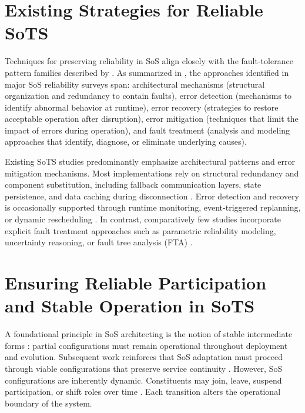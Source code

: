 
\section{Existing Strategies for Reliable SoTS} \label{approach:reliability-strategies}
Techniques for preserving reliability in SoS align closely with the fault-tolerance pattern families described by \citet{hanmer2013patterns}. As summarized in , the approaches identified in major SoS reliability surveys \cite{ferreira2021reliability, uday2015designing, abdelmoumen2026comprehensive} span: architectural mechanisms (structural organization and redundancy to contain faults), error detection (mechanisms to identify abnormal behavior at runtime), error recovery (strategies to restore acceptable operation after disruption), error mitigation (techniques that limit the impact of errors during operation), and fault treatment (analysis and modeling approaches that identify, diagnose, or eliminate underlying causes).

Existing SoTS studies predominantly emphasize architectural patterns and error mitigation mechanisms. Most implementations rely on structural redundancy and component substitution, including fallback communication layers, state persistence, and data caching during disconnection \cite{acharya2023twins, aziz2022empowering, larsen2024towards, lopez2023modeling}. Error detection and recovery is occasionally supported through runtime monitoring, event-triggered replanning, or dynamic rescheduling \cite{park2020digital, villalonga2021decision-making}. In contrast, comparatively few studies incorporate explicit fault treatment approaches such as parametric reliability modeling, uncertainty reasoning, or fault tree analysis (FTA) \cite{kutzke2021subsystem, oquendo2019dealing, saraeian2022digital}. 


\section{Ensuring Reliable Participation and Stable Operation in SoTS}

A foundational principle in SoS architecting is the notion of stable intermediate forms \cite{maier1998architecting}: partial configurations must remain operational throughout deployment and evolution. Subsequent work reinforces that SoS adaptation must proceed through viable configurations that preserve service continuity \cite{rechtin1991systems, rechtin2010art, mekdeci2014pliability, petitdemange2021design, weyns2013challenges}. However, SoS configurations are inherently dynamic. Constituents may join, leave, suspend participation, or shift roles over time \cite{fang2020improving, manzano2020dynamic, pradhan2016achieving, mohsin2019modeling}. Each transition alters the operational boundary of the system.

